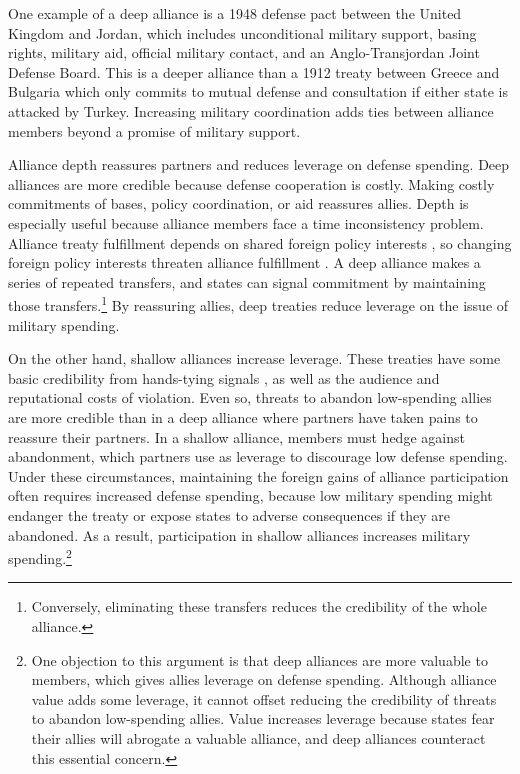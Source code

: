 \documentclass[12pt]{article}
\begin{document}
 
One example of a deep alliance is a 1948 defense pact between the United Kingdom and Jordan, which includes unconditional military support, basing rights, military aid, official military contact, and an Anglo-Transjordan Joint Defense Board.  
This is a deeper alliance than a 1912 treaty between Greece and Bulgaria which only commits to mutual defense and consultation if either state is attacked by Turkey. 
Increasing military coordination adds ties between alliance members beyond a promise of military support.


Alliance depth reassures partners and reduces leverage on defense spending.  
Deep alliances are more credible because defense cooperation is costly. 
Making costly commitments of bases, policy coordination, or aid reassures allies. 
Depth is especially useful because alliance members face a time inconsistency problem. 
Alliance treaty fulfillment depends on shared foreign policy interests \citep{Morrow2000, Leeds2003a}, so changing foreign policy interests threaten alliance fulfillment \citep{LeedsSavun2007}. 
A deep alliance makes a series of repeated transfers, and states can signal commitment by maintaining those transfers.\footnote{Conversely, eliminating these transfers reduces the credibility of the whole alliance.} 
By reassuring allies, deep treaties reduce leverage on the issue of military spending. 


On the other hand, shallow alliances increase leverage. 
These treaties have some basic credibility from hands-tying signals \citep{Fearon1997}, as well as the audience \cite{Morrow2000} and reputational \citep{Gibler2008, Crescenzietal2012} costs of violation.
Even so, threats to abandon low-spending allies are more credible than in a deep alliance where partners have taken pains to reassure their partners.  
In a shallow alliance, members must hedge against abandonment, which partners use as leverage to discourage low defense spending. 
Under these circumstances, maintaining the foreign gains of alliance participation often requires increased defense spending, because low military spending might endanger the treaty or expose states to adverse consequences if they are abandoned. 
As a result, participation in shallow alliances increases military spending.\footnote{
One objection to this argument is that deep alliances are more valuable to members, which gives allies leverage on defense spending. 
Although alliance value adds some leverage, it cannot offset reducing the credibility of threats to abandon low-spending allies.
Value increases leverage because states fear their allies will abrogate a valuable alliance, and deep alliances counteract this essential concern. 
}
\end{document}
